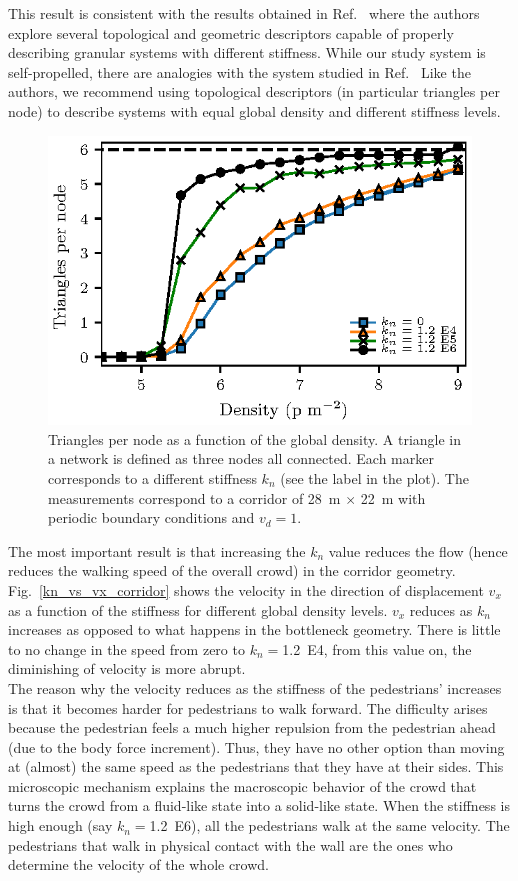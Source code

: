 \documentclass[preprint,12pt]{elsarticle}
\begin{document}
This result is consistent with the results obtained in Ref.~\cite{pugnaloni_2013} where the authors explore several topological and geometric descriptors capable of properly describing granular systems with different stiffness. While our study system is self-propelled, there are analogies with the system studied in Ref.~\cite{pugnaloni_2013} Like the authors, we recommend using topological descriptors (in particular triangles per node) to describe systems with equal global density and different stiffness levels.\\

\begin{figure}[htbp!]
\centering
\includegraphics[width=0.7\columnwidth]
{./triangles.eps}
\caption{\label{triangles} Triangles per node as a function of the global density. A triangle in a network is defined as three nodes all connected. Each marker corresponds to a different stiffness $k_n$ (see the label in the plot). The measurements correspond to a corridor of 28~m $\times$ 22~m with periodic boundary conditions and $v_d=1$.  }
\end{figure}

The most important result is that increasing the $k_n$ value reduces the flow (hence reduces the walking speed of the overall crowd) in the corridor geometry. Fig.~\ref{kn_vs_vx_corridor} shows the velocity in the direction of displacement $v_x$ as a function of the stiffness for different global density levels. $v_x$ reduces as $k_n$ increases as opposed to what happens in the bottleneck geometry. There is little to no change in the speed from zero to $k_n=$1.2~E4, from this value on, the diminishing of velocity is more abrupt.\\

The reason why the velocity reduces as the stiffness of the pedestrians' increases is that it becomes harder for pedestrians to walk forward. The difficulty arises because the pedestrian feels a much higher repulsion from the pedestrian ahead (due to the body force increment). Thus, they have no other option than moving at (almost) the same speed as the pedestrians that they have at their sides. This microscopic mechanism explains the macroscopic behavior of the crowd that turns the crowd from a fluid-like state into a solid-like state. When the stiffness is high enough (say $k_n=$1.2~E6), all the pedestrians walk at the same velocity. The pedestrians that walk in physical contact with the wall are the ones who determine the velocity of the whole crowd.\\
\end{document}
